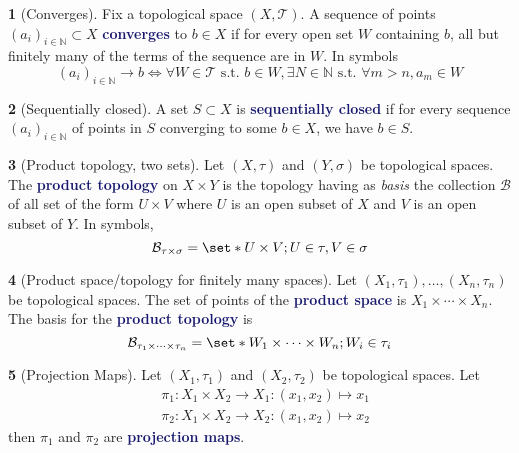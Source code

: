 \documentclass[11pt]{article}
\numberwithin{equation}{section}
\newcommand{\navy}[1]{\textcolor{MidnightBlue}{\bf #1}}
\theoremstyle{plain}
\theoremstyle{definition}
\newtheorem{definition}{\color{MidnightBlue}{\textbf{Definition}}}[section]
\def\Set{\set*}%
\def\ss{\subset}
\newcommand{\1}{\mathbbm 1}
\def\t{\tau}
\newcommand{\NN}{\mathbb N}
\newcommand{\tT}{\mathcal T}
\newcommand{\bB}{\mathcal B}
\begin{document}
\begin{definition}[Converges]
Fix a topological space $(X,\tT)$. A sequence of points $(a_i)_{i \in \NN} \ss X$ \navy{converges} to $b \in X$ if for every open set $W$ containing $b$, all but finitely many of the terms of the sequence are in $W$. In symbols
\begin{equation*}
(a_i)_{i \in \NN} \to b \iff \forall W\in \tT \text{ s.t. } b \in W, \exists N \in \NN \text{ s.t. } \forall m > n, a_m \in W
\end{equation*}

\end{definition}

\begin{definition}[Sequentially closed]
A set $S \ss X$ is \navy{sequentially closed} if for every sequence $(a_i)_{i \in \NN}$ of points in $S$ converging to some $b \in X$, we have $b \in S$.
\end{definition}

\begin{definition}[Product topology, two sets]
Let $(X,\t)$ and $(Y,\sigma)$ be topological spaces. The \navy{product topology} on $X \times Y$ is the topology having as \emph{basis} the collection $\bB$ of all set of the form $U \times V$ where $U$ is an open subset of $X$ and $V$ is an open subset of $Y$. In symbols,
\begin{equation}
\bB_{\t \times \sigma} = \Set{U \times V; U \in \t, V \in \sigma}
\end{equation}
\end{definition}

\begin{definition}[Product space/topology for finitely many spaces]
Let $(X_1,\t_1), \ldots, (X_n,\t_n)$ be topological spaces. The set of points of the \navy{product space} is $X_1 \times \cdots \times X_n$. The basis for the \navy{product topology} is
\begin{equation}
\bB_{\t_1 \times \cdots \times \t_n} = \Set{W_1 \times \cdots \times W_n; W_i \in \t_i}
\end{equation}
\end{definition}

\begin{definition}[Projection Maps]
Let $(X_1,\t_1)$ and $(X_2,\t_2)$ be topological spaces. Let
\begin{align*}
&\pi_1:X_1 \times X_2 \to X_1 : (x_1,x_2) \mapsto x_1 \\
&\pi_2:X_1 \times X_2 \to X_2 : (x_1,x_2) \mapsto x_2
\end{align*}
then $\pi_1$ and $\pi_2$ are \navy{projection maps}.
\end{definition}
\end{document}
